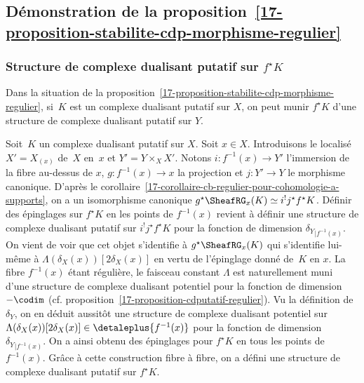 \documentclass[10pt]{../fichiers-configuration-latex/smfart}
\begin{document}
\subsection{Démonstration de la proposition~\ref{17-proposition-stabilite-cdp-morphisme-regulier}}%

\subsubsection{Structure de complexe dualisant putatif sur \texorpdfstring{$f^\star K$}{f*K}}%

\begin{lemme3}\label{17-lemme-construction-cdputatif-f-star}
Dans la situation de la
proposition~\ref{17-proposition-stabilite-cdp-morphisme-regulier}, si $K$ est
un complexe dualisant putatif sur $X$,
on peut munir $f^\star K$ d'une structure de
complexe dualisant putatif sur $Y$.
\end{lemme3}

Soit $K$ un complexe dualisant putatif sur $X$.
Soit $x\in X$. Introduisons le localisé $X'=X_{(x)}$ de $X$ en $x$ et
$Y'=Y\times_X X'$. Notons
$i\colon f^{-1}(x)\to Y'$ l'immersion de la fibre au-dessus de $x$,
$g\colon f^{-1}(x)\to x$ la projection et $j\colon Y'\to Y$ le morphisme
canonique.
D'après le
corollaire~\ref{17-corollaire-cb-regulier-pour-cohomologie-a-supports},
on a un isomorphisme canonique $g^\star
\SheafRG_x(K)\simeq i^!j^\star f^\star K$. Définir des épinglages
sur $f^\star K$ en les points de $f^{-1}(x)$ revient à définir une
structure de complexe dualisant putatif sur $i^!j^\star f^\star K$ pour
la fonction de dimension ${\delta_Y}_{|f^{-1}(x)}$. On vient de voir que
cet objet s'identifie à $g^\star \SheafRG_x(K)$ qui s'identifie
lui-même à $\Lambda(\delta_X(x))[2\delta_X(x)]$ en vertu de l'épinglage
donné de $K$ en $x$. La fibre $f^{-1}(x)$ étant régulière, le faisceau
constant $\Lambda$ est naturellement muni d'une structure de complexe
dualisant potentiel pour la fonction de dimension $-\codim$ (cf.
proposition~\ref{17-proposition-cdputatif-regulier}). Vu la définition de
$\delta_Y$, on en déduit aussitôt une structure de complexe dualisant
potentiel sur $\Lambda(\delta_X(x))[2\delta_X(x)]\in\detaleplus {f^{-1}(x)}$
pour la fonction de dimension ${\delta_Y}_{|f^{-1}(x)}$.
On a ainsi obtenu des
épinglages pour $f^\star K$ en tous les points de
$f^{-1}(x)$. Grâce à cette construction fibre à fibre, on a défini
une structure de complexe dualisant putatif sur $f^\star K$.
\end{document}
